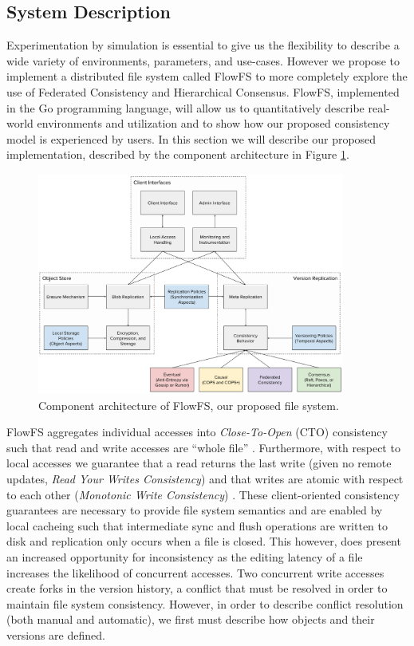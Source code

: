 \documentclass{article}
\begin{document}
\subsection{System Description}
\label{sec:system}

Experimentation by simulation is essential to give us the flexibility to describe a wide variety of environments, parameters, and use-cases. However we propose to implement a distributed file system called FlowFS to more completely explore the use of Federated Consistency and Hierarchical Consensus. FlowFS, implemented in the Go programming language, will allow us to quantitatively describe real-world environments and utilization and to show how our proposed consistency model is experienced by users. In this section we will describe our proposed implementation, described by the component architecture in Figure \ref{fig:architecture}.

\begin{figure}
    \centering
        \includegraphics[width=0.9\textwidth]{figures/architecture}
        \caption{Component architecture of FlowFS, our proposed file system.}
        \label{fig:architecture}
\end{figure}

FlowFS aggregates individual accesses into \textit{Close-To-Open} (CTO) consistency such that read and write accesses are ``whole file'' \cite{muthitacharoen_low-bandwidth_2001}. Furthermore, with respect to local accesses we guarantee that a read returns the last write (given no remote updates, \textit{Read Your Writes Consistency}) and that writes are atomic with respect to each other (\textit{Monotonic Write Consistency}) \cite{bermbach_consistency_2013}. These client-oriented consistency guarantees are necessary to provide file system semantics and are enabled by local cacheing such that intermediate sync and flush operations are written to disk and replication only occurs when a file is closed. This however, does present an increased opportunity for inconsistency as the editing latency of a file increases the likelihood of concurrent accesses. Two concurrent write accesses create forks in the version history, a conflict that must be resolved in order to maintain file system consistency. However, in order to describe conflict resolution (both manual and automatic), we first must describe how objects and their versions are defined.
\end{document}
